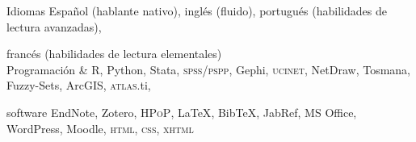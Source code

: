





\begin{cvskills}

\cvskill
{Idiomas} 
{Español (hablante nativo), inglés (fluido), portugués (habilidades de lectura avanzadas),} 

\cvskill
{} 
{francés (habilidades de lectura elementales)} \\

\cvskill
{Programación \&} 
{R, Python, Stata, {\scshape spss/pspp}, Gephi, {\scshape ucinet}, NetDraw, Tosmana, Fuzzy-Sets, ArcGIS, {\scshape atlas}.ti,}

\cvskill
{software} 
{EndNote, Zotero, {\scshape HPoP}, {\LaTeX}, Bib{\TeX}, JabRef, MS Office, WordPress, Moodle, {\scshape html}, {\scshape css}, {\scshape xhtml}} \\

\end{cvskills}
